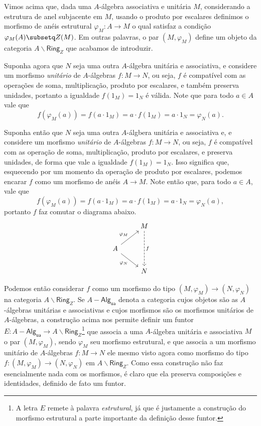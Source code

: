 Vimos acima que, dada uma $A$-álgebra associativa e unitária $M$, considerando a estrutura de anel subjacente em $M$, usando o produto por escalares definimos o morfismo de anéis estrutural $\varphi_{M}: A \to M$ o qual satisfaz a condição $\varphi_{M}(A) \subsetq Z(M)$.
Em outras palavras, o par $(M,\varphi_{M})$ define um objeto da categoria $A \backslash \mathsf{Ring}_{Z}$ que acabamos de introduzir.

Suponha agora que $N$ seja uma outra $A$-álgebra unitária e associativa, e considere um morfismo \emph{unitário} de $A$-álgebras $f: M \to N$, ou seja, $f$ é compatível com as operações de soma, multiplicação, produto por escalares, e também preserva unidades, portanto a igualdade $f(1_{M}) = 1_{N}$ é válida.
Note que para todo $a \in A$ vale que
\begin{displaymath}
  f(\varphi_{M}(a)) = f(a \cdot 1_{M}) = a \cdot f(1_{M}) = a \cdot 1_{N} = \varphi_{N}(a).
\end{displaymath}

Suponha então que $N$ seja uma outra $A$-álgbera unitária e associativa e, e considere um morfismo \emph{unitário} de $A$-álgebras $f: M \to N$, ou seja, $f$ é compatível com as operação de soma, multiplicação, produto por escalares, e preserva unidades, de forma que vale a igualdade $f(1_{M}) = 1_{N}$.
Isso significa que, esquecendo por um momento da operação de produto por escalares, podemos encarar $f$ como um morfismo de anéis $A \to M$.
Note então que, para todo $a \in A$, vale que
\begin{displaymath}
  f(\varphi_{M}(a)) = f(a \cdot 1_{M}) = a \cdot f(1_{M}) = a \cdot 1_{N} = \varphi_{N}(a),
\end{displaymath}
portanto $f$ faz comutar o diagrama abaixo.
\begin{displaymath}
  \begin{tikzcd}
    & M
    \arrow[dd, dashed, "f"]
    \\ A
    \arrow[ru, "\varphi_M"]
    \arrow[rd, "\varphi_N" swap]
    \\ & N
  \end{tikzcd}
\end{displaymath}

Podemos então considerar $f$ como um morfismo do tipo $(M,\varphi_{M}) \to (N,\varphi_{N})$ na categoria $A \backslash \mathsf{Ring}_{Z}$.
Se $A-\mathsf{Alg_{ua}}$ denota a categoria cujos objetos são as $A$-álgebras unitárias e associativas e cujos morfismos são os morfismos unitários de $A$-álgebras, a construção acima nos permite definir um funtor $E: A-\mathsf{Alg_{ua}} \to A \backslash \mathsf{Ring}_{Z}$\footnote{A letra $E$ remete à palavra \emph{estrutural}, já que é justamente a construção do morfismo estrutural a parte importante da definição desse funtor.} que associa a uma $A$-álgebra unitária e associativa $M$ o par $(M,\varphi_{M})$, sendo $\varphi_{M}$ seu morfismo estrutural, e que associa a um morfismo unitário de $A$-álgebras $f: M \to N$ ele mesmo visto agora como morfismo do tipo $f: (M,\varphi_{M}) \to (N,\varphi_{N})$ em $A \backslash \mathsf{Ring}_{Z}$.
Como essa construção não faz esencialmente nada com os morfismos, é claro que ela preserva composições e identidades, definido de fato um funtor.

